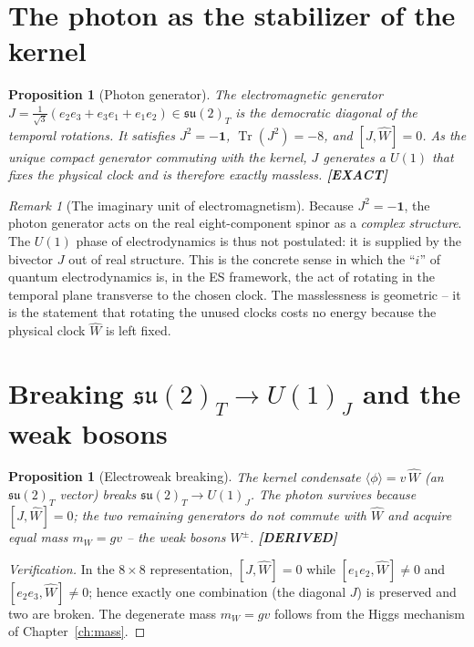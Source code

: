 \documentclass[11pt,oneside]{book}
\newcommand{\Wh}{\hat{W}}                         %
\newcommand{\Tr}{\operatorname{Tr}}
\newcommand{\su}{\mathfrak{su}}
\newcommand{\status}[1]{{\sffamily\bfseries\color{statuscol}[#1]}}
\theoremstyle{plain}
\newtheorem{proposition}[theorem]{Proposition}
\theoremstyle{definition}
\theoremstyle{remark}
\newtheorem{remark}[theorem]{Remark}
\begin{document}
\section{The photon as the stabilizer of the kernel}
\label{sec:photon}

\begin{proposition}[Photon generator]
\label{prop:photon}
The electromagnetic generator $J=\tfrac{1}{\sqrt3}(e_2e_3+e_3e_1+e_1e_2)\in\su(2)_T$
is the democratic diagonal of the temporal rotations. It satisfies
$J^2=-\mathbf 1$, $\Tr(J^2)=-8$, and $[J,\Wh]=0$. As the unique compact generator
commuting with the kernel, $J$ generates a $U(1)$ that fixes the physical clock and
is therefore exactly massless. \status{EXACT}
\end{proposition}

\begin{remark}[The imaginary unit of electromagnetism]
\label{rem:i-of-qed}
Because $J^2=-\mathbf 1$, the photon generator acts on the real eight-component
spinor as a \emph{complex structure}. The $U(1)$ phase of electrodynamics is thus
not postulated: it is supplied by the bivector $J$ out of real structure. This is
the concrete sense in which the ``$i$'' of quantum electrodynamics is, in the ES
framework, the act of rotating in the temporal plane transverse to the chosen
clock. The masslessness is geometric -- it is the statement that rotating the
unused clocks costs no energy because the physical clock $\Wh$ is left fixed.
\end{remark}

\section{Breaking $\su(2)_T\to U(1)_J$ and the weak bosons}
\label{sec:breaking}

\begin{proposition}[Electroweak breaking]
\label{prop:ew-breaking}
The kernel condensate $\langle\phi\rangle=v\,\Wh$ (an $\su(2)_T$ vector) breaks
$\su(2)_T\to U(1)_J$. The photon survives because $[J,\Wh]=0$; the two remaining
generators do not commute with $\Wh$ and acquire equal mass $m_W=gv$ -- the weak
bosons $W^\pm$. \status{DERIVED}
\end{proposition}

\begin{proof}[Verification]
In the $8\times8$ representation, $[J,\Wh]=0$ while $[e_1e_2,\Wh]\neq0$ and
$[e_2e_3,\Wh]\neq0$; hence exactly one combination (the diagonal $J$) is preserved
and two are broken. The degenerate mass $m_W=gv$ follows from the Higgs mechanism
of Chapter~\ref{ch:mass}.
\end{proof}
\end{document}
